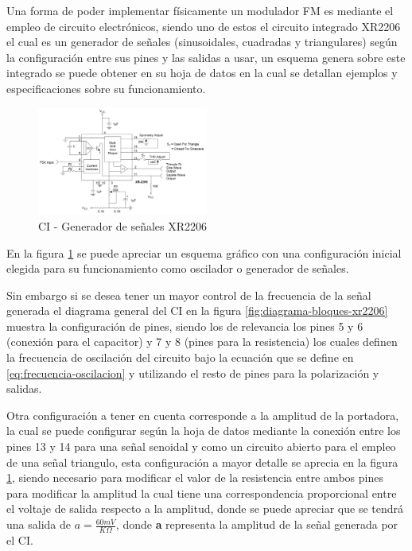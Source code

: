 \documentclass[conference]{IEEEtran}
\begin{document}
	Una forma de poder implementar físicamente un modulador FM es mediante el empleo de circuito electrónicos, siendo uno de estos el circuito integrado XR2206 el cual es un generador de señales (sinusoidales, cuadradas y triangulares) según la configuración entre sus pines y las salidas a usar, un esquema genera sobre este integrado se puede obtener en su hoja de datos en la cual se detallan ejemplos y especificaciones sobre su funcionamiento.
	
	\begin{figure}[h]
		\centering
		\includegraphics[width=0.5\textwidth]{media/integrado-xr2206}
		\caption{CI - Generador de señales XR2206}
		\label{fig:integrado-xr2206}
	\end{figure}
	
	En la figura \ref{fig:integrado-xr2206} se puede apreciar un esquema gráfico con una configuración inicial elegida para su funcionamiento como oscilador o generador de señales.
	
	Sin embargo si se desea tener un mayor control de la frecuencia de la señal generada el diagrama general del CI en la figura \ref{fig:diagrama-bloques-xr2206} muestra la configuración de pines, siendo los de relevancia los pines 5 y 6 (conexión para el capacitor) y 7 y 8 (pines para la resistencia) los cuales definen la frecuencia de oscilación del circuito bajo la ecuación que se define en \ref{eq:frecuencia-oscilacion} y utilizando el resto de pines para la polarización y salidas.
	
	Otra configuración a tener en cuenta corresponde a la amplitud de la portadora, la cual se puede configurar según la hoja de datos mediante la conexión entre los pines 13 y 14 para una señal senoidal y como un circuito abierto para el empleo de una señal triangulo, esta configuración a mayor detalle se aprecia en la figura \ref{fig:integrado-xr2206}, siendo necesario para modificar el valor de la resistencia entre ambos pines para modificar la amplitud la cual tiene una correspondencia proporcional entre el voltaje de salida respecto a la amplitud, donde se puede apreciar que se tendrá una salida de $a = \frac{60mV}{K\Omega}$, donde \textbf{a} representa la amplitud de la señal generada por el CI.
	
\end{document}
